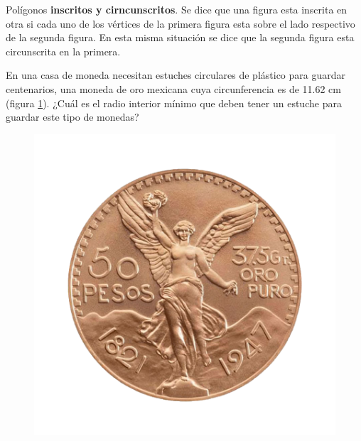 \documentclass[11pt]{book}
\begin{document}
\begin{enumerate}
        \begin{boxE}
          Polígonos \textbf{\color{cyan}inscritos y cirncunscritos}. Se dice que una figura esta inscrita en otra si cada
          uno de los vértices de la primera figura esta sobre el lado respectivo de la segunda figura.
          En esta misma situación se dice que la segunda figura esta circunscrita en la primera.
        \end{boxE}

        \begin{minipage}[t]{0.7\textwidth}
          \item En una casa de moneda necesitan estuches circulares de
          plástico para guardar centenarios, una moneda de oro mexicana cuya circunferencia es de 11.62 cm (figura \ref{fig:moneda}). ¿Cuál
          es el radio interior mínimo que deben tener un estuche para guardar este tipo de monedas?
        \end{minipage}\hfill
        \begin{minipage}[t]{0.2\textwidth}
          \begin{figure}[H]
            \centering
            \includegraphics[width=\linewidth]{moneda.png}
            \label{fig:moneda}
          \end{figure}
        \end{minipage}




\end{enumerate}
\end{document}
